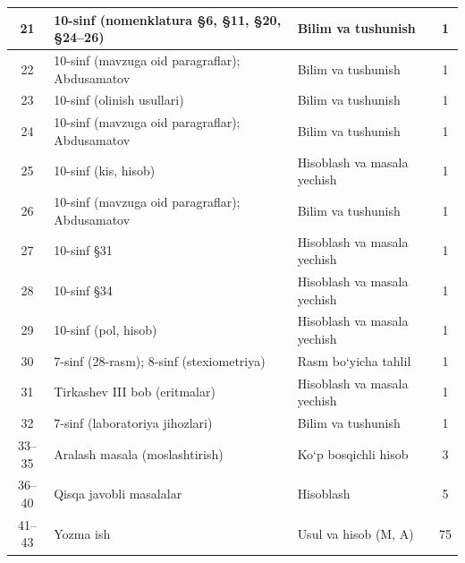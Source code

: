 \documentclass[11pt,a4paper]{article}
\begin{document}
{\begin{longtable}{|c|p{7.2cm}|p{5.4cm}|c|}
21 & 10-sinf (nomenklatura \S{}6, \S{}11, \S{}20, \S{}24--26) & Bilim va tushunish & 1\\\hline
22 & 10-sinf (mavzuga oid paragraflar); Abdusamatov & Bilim va tushunish & 1\\\hline
23 & 10-sinf (olinish usullari) & Bilim va tushunish & 1\\\hline
24 & 10-sinf (mavzuga oid paragraflar); Abdusamatov & Bilim va tushunish & 1\\\hline
25 & 10-sinf (kis, hisob) & Hisoblash va masala yechish & 1\\\hline
26 & 10-sinf (mavzuga oid paragraflar); Abdusamatov & Bilim va tushunish & 1\\\hline
27 & 10-sinf \S{}31 & Hisoblash va masala yechish & 1\\\hline
28 & 10-sinf \S{}34 & Hisoblash va masala yechish & 1\\\hline
29 & 10-sinf (pol, hisob) & Hisoblash va masala yechish & 1\\\hline
30 & 7-sinf (28-rasm); 8-sinf (stexiometriya) & Rasm bo`yicha tahlil & 1\\\hline
31 & Tirkashev III bob (eritmalar) & Hisoblash va masala yechish & 1\\\hline
32 & 7-sinf (laboratoriya jihozlari) & Bilim va tushunish & 1\\\hline
33--35 & Aralash masala (moslashtirish) & Ko`p bosqichli hisob & 3\\\hline
36--40 & Qisqa javobli masalalar & Hisoblash & 5\\\hline
41--43 & Yozma ish & Usul va hisob (M, A) & 75\\\hline
\end{longtable}}
\end{document}
